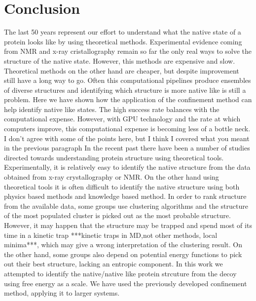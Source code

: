 \documentclass[12pt]{article}
\newcommand{\Alberto}[1]{\color{ForestGreen}#1\normalcolor }
\begin{document}
\section{Conclusion}


\Alberto{The last 50 years represent our effort to understand what the native state of a protein
    looks like by using theoretical methods. Experimental evidence coming from NMR and x-ray
    cristallography remain so far the only real ways to solve the structure of the native state.
    However, this methods are expensive and slow. Theoretical methods on the other hand are cheaper,
    but despite improvement still have a long way to go. Often this computational pipelines produce
    ensembles of diverse structures and identifying which structure is more native like is still a
    problem. Here we have shown how the application of the confinement method can help identify
    native like states. The high success rate balances with the computational expense. However, with
    GPU technology and the rate at which computers improve, this computational expense is becoming
less of a bottle neck.}
\Alberto{I don't agree with some of the points here, but I think I covered what you meant in the
previous paragraph}
In the recent past there have been a number of studies directed towards understanding protein 
structure using theoretical tools. Experimentally, it is relatively easy to identify the native structure from the data obtained 
from x-ray crystallography or NMR. On the other hand using theoretical tools it is often difficult to identify the native structure 
using both physics based methods and knowledge based method. In order to rank structure from the available data, some groups use 
clustering algorithms and the structure of the
most populated cluster is picked out as the most probable structure. However, it may happen that the structure may be trapped and 
spend most of its time in a kinetic trap ***kinetic traps in MD,not other methods, local
minima***, which may give a wrong interpretation of the clustering result. On the other hand, some groups
also depend on potential energy functions to pick out their best structure, lacking an entropic
component. In this work we attempted to identify the native/native like protein strcuture from the decoy using free energy as a scale.
We have used the previously developed confinement method, applying it to larger systems.
\end{document}
